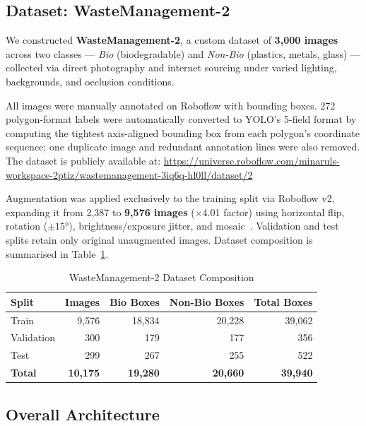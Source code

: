 \documentclass[runningheads]{llncs}
\begin{document}
\subsection{Dataset: WasteManagement-2}

We constructed \textbf{WasteManagement-2}, a custom dataset of
\textbf{3,000 images} across two classes — \textit{Bio}
(biodegradable) and \textit{Non-Bio} (plastics, metals, glass) —
collected via direct photography and internet sourcing under varied
lighting, backgrounds, and occlusion conditions.

All images were manually annotated on Roboflow with bounding boxes.
272 polygon-format labels were automatically converted to YOLO's
5-field format by computing the tightest axis-aligned bounding box
from each polygon's coordinate sequence; one duplicate image and
redundant annotation lines were also removed. The dataset is publicly
available at: \url{https://universe.roboflow.com/minaruls-workspace-2ptiz/wastemanagement-3iq6q-hl0ll/dataset/2}

Augmentation was applied exclusively to the training split via
Roboflow v2, expanding it from 2,387 to \textbf{9,576 images}
($\times$4.01 factor) using horizontal flip, rotation ($\pm15°$),
brightness/exposure jitter, and mosaic~\cite{bochkovskiy2020yolov4}. Validation and test splits
retain only original unaugmented images. Dataset composition is
summarised in Table~\ref{tab:dataset}.

\begin{table}[H]
\centering
\caption{WasteManagement-2 Dataset Composition}
\label{tab:dataset}
\begin{tabular}{lrrrr}
\toprule
\textbf{Split} & \textbf{Images} & \textbf{Bio Boxes} & \textbf{Non-Bio Boxes} & \textbf{Total Boxes} \\
\midrule
Train      & 9,576  & 18,834 & 20,228 & 39,062 \\
Validation & 300    & 179    & 177    & 356    \\
Test       & 299    & 267    & 255    & 522    \\
\midrule
\textbf{Total} & \textbf{10,175} & \textbf{19,280} & \textbf{20,660} & \textbf{39,940} \\
\bottomrule
\end{tabular}
\end{table}

\subsection{Overall Architecture}
\end{document}
